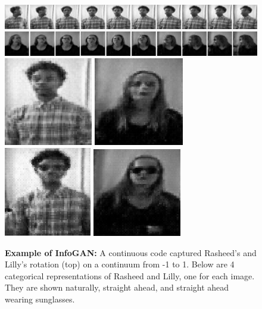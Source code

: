 \documentclass[conference,11pt]{IEEEtran}
\begin{document}
\begin{figure}[t]
\includegraphics[width=\linewidth]{pictures/personal/rasheed-rotate-final.jpg}\vspace{2mm}
\includegraphics[width=\linewidth]{pictures/personal/lilly-rotate-final.jpg}\vspace{2mm}
\includegraphics[width=.24\linewidth]{pictures/personal/bestRasheed.png}
\includegraphics[width=.24\linewidth]{pictures/personal/bestLilly.png}
\includegraphics[width=.24\linewidth,trim={0 0 0 .22em},clip]{pictures/personal/bestRasheedGlasses.png}
\includegraphics[width=.24\linewidth]{pictures/personal/bestLillyGlasses.png}
\caption{\textbf{Example of InfoGAN:}  A continuous code captured Rasheed's and Lilly's rotation (top) on a continuum from -1 to 1.  Below are 4 categorical representations of Rasheed and Lilly, one for each image. They are shown naturally, straight ahead, and straight ahead wearing sunglasses.}
\end{figure}
\end{document}

